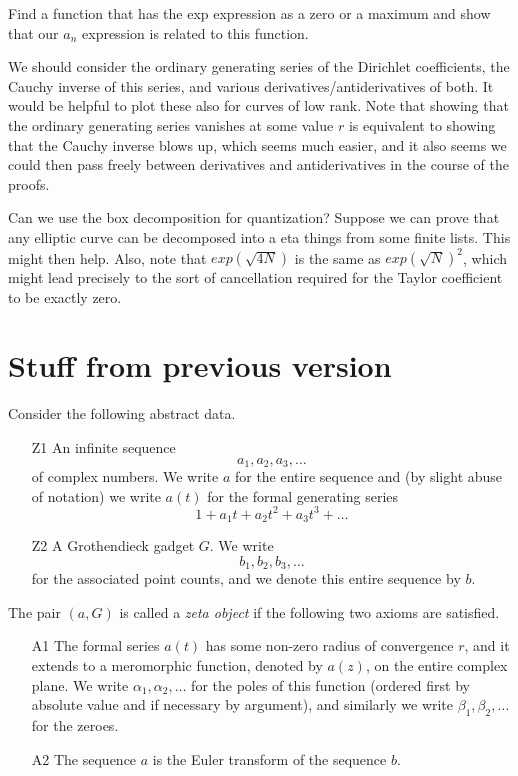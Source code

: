 \documentclass[paper=a4, fontsize=11pt]{scrartcl} %
\numberwithin{equation}{section} %
\numberwithin{figure}{section} %
\numberwithin{table}{section} %
\begin{document}
Find a function that has the exp expression as a zero or a maximum and show that our $a_n$ expression is related to this function.

We should consider the ordinary generating series of the Dirichlet coefficients, the Cauchy inverse of this series, and various derivatives/antiderivatives of both. It would be helpful to plot these also for curves of low rank. Note that showing that the ordinary generating series vanishes at some value $r$ is equivalent to showing that the Cauchy inverse blows up, which seems much easier, and it also seems we could then pass freely between derivatives and antiderivatives in the course of the proofs.

Can we use the box decomposition for quantization? Suppose we can prove that any elliptic curve can be decomposed into a eta things from some finite lists. This might then help. Also, note that $exp(\sqrt{4N})$ is the same as $exp(\sqrt{N})^2$, which might lead precisely to the sort of cancellation required for the Taylor coefficient to be exactly zero.


\section{Stuff from previous version}

Consider the following abstract data.

\begin{itemize}
\item[Z1] An infinite sequence
$$ a_1, a_2, a_3, \ldots  $$
of complex numbers. We write $a$ for the entire sequence and (by slight abuse of notation) we write $a(t)$ for the formal generating series
$$ 1 + a_1 t + a_2 t^2 + a_3 t^3 + \ldots $$
\item[Z2] A Grothendieck gadget $G$. We write
$$ b_1, b_2, b_3, \ldots   $$
for the associated point counts, and we denote this entire sequence by $b$.
\end{itemize}

The pair $(a, G)$ is called a \emph{zeta object} if the following two axioms are satisfied.
\begin{itemize}
\item[A1] The formal series $a(t)$ has some non-zero radius of convergence $r$, and it extends to a meromorphic function, denoted by $a(z)$, on the entire complex plane. We write $\alpha_1, \alpha_2, \ldots$ for the poles of this function (ordered first by absolute value and if necessary by argument), and similarly we write $\beta_1, \beta_2, \ldots$ for the zeroes.
\item[A2] The sequence $a$ is the Euler transform of the sequence $b$.
\end{itemize}
\end{document}
